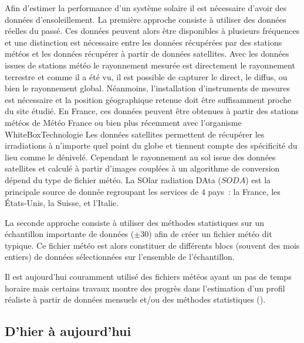 Afin d’estimer la performance d’un système solaire il est nécessaire d’avoir des
données d’ensoleillement. La première approche consiste à utiliser des données réelles
du passé. Ces données peuvent alors être disponibles à plusieurs fréquences et
une distinction est nécessaire entre les données récupérées par des stations météos et les
données récupérer à partir de données satellites. Avec les données issues de stations météo
le rayonnement mesurée est directement le rayonnement
terrestre et comme il a été vu, il est possible de capturer le direct,
le diffus, ou bien le rayonnement global. Néanmoins, l’installation d’instruments de mesures est nécessaire et
la position géographique retenue doit être suffisamment proche du site étudié.
En France, ces données peuvent être obtenues à partir des stations météos de
Météo France ou bien plus récemment avec l’organisme WhiteBoxTechnologie 
Les données satellites permettent de récupérer les irradiations à n’importe quel
point du globe et tiennent compte des spécificité du lieu comme le dénivelé. Cependant
le rayonnement au sol issue des données satellites et calculé à partir d’images couplées
à un algorithme de conversion dépend du type de fichier météo.
La SOlar radiation DAta ($SODA$) est la principale source de donnée regroupant les
services de 4 pays~: la France, les États-Unis, la Suisse, et l’Italie.

La seconde approche consiste à utiliser des méthodes statistiques sur un échantillon
importante de données ($\pm 30$) afin de créer un fichier météo dit typique. Ce fichier
météo est alors constituer de différents blocs (souvent des mois entiers) de données
sélectionnées sur l’ensemble de l’échantillon.


Il est aujourd’hui couramment utilisé des fichiers météos
ayant un pas de temps horaire mais certains travaux montre des progrès dans l’estimation
d’un profil réaliste à partir de données mensuels et/ou des méthodes statistiques
().







\subsection{D’hier à aujourd’hui} %
\label{sub:d_hier_a_aujourd_hui}
~

